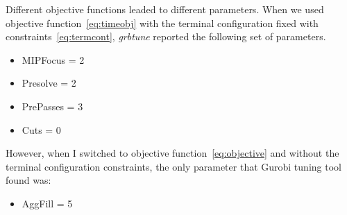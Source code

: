 Different objective functions leaded to different parameters. When we used
objective function~\eqref{eq:timeobj} with the terminal configuration fixed
with constraints~\eqref{eq:termcont}, \textit{grbtune} reported the following
set of parameters.
\begin{itemize}
    \item MIPFocus = 2
    \item Presolve = 2
    \item PrePasses = 3
    \item Cuts = 0
\end{itemize}

However, when I switched to objective function~\eqref{eq:objective} and
without the terminal configuration constraints, the only parameter that Gurobi
tuning tool found was:
\begin{itemize}
    \item AggFill = 5
\end{itemize}
